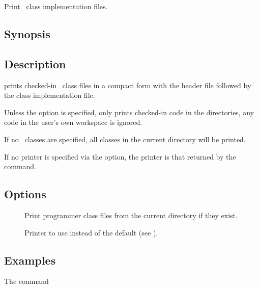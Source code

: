 

Print \aipspp\ class implementation files.

\subsection*{Synopsis}

\begin{synopsis}
\end{synopsis}

\subsection*{Description}

 prints checked-in \aipspp\ class files in a compact form with the
header file followed by the class implementation file.

Unless the  option is specified,  only prints checked-in code
in the  directories, any code in the user's own workspace is
ignored.

If no \aipspp\ classes are specified, all classes in the current directory
will be printed.

If no printer is specified via the  option, the printer is that
returned by the  command.

\subsection*{Options}

\begin{description}
\item[]
   Print programmer class files from the current directory if they exist.

\item[]
   Printer to use instead of the default (see ).
\end{description}

\subsection*{Examples}

The command

